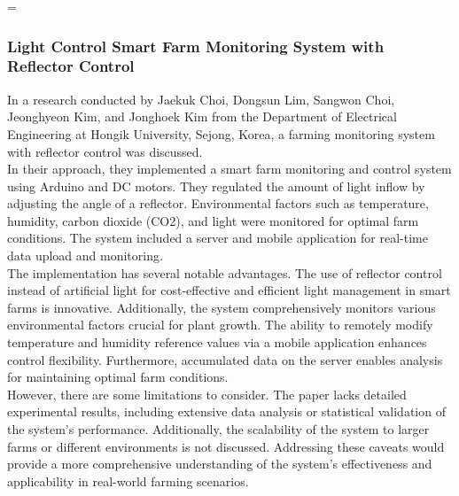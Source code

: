=\documentclass[12pt, a4paper]{article}
\begin{document}
\subsubsection{Light Control Smart Farm Monitoring System with Reflector Control}
In a research conducted by Jaekuk Choi, Dongsun Lim, Sangwon Choi, Jeonghyeon Kim, and Jonghoek Kim \cite{choi2020light} from the Department of Electrical Engineering at Hongik University, Sejong, Korea, a farming monitoring system with reflector control was discussed.\\
In their approach, they implemented a smart farm monitoring and control system using Arduino and DC motors. They regulated the amount of light inflow by adjusting the angle of a reflector. Environmental factors such as temperature, humidity, carbon dioxide (CO2), and light were monitored for optimal farm conditions. The system included a server and mobile application for real-time data upload and monitoring.\\
The implementation has several notable advantages. The use of reflector control instead of artificial light for cost-effective and efficient light management in smart farms is innovative. Additionally, the system comprehensively monitors various environmental factors crucial for plant growth. The ability to remotely modify temperature and humidity reference values via a mobile application enhances control flexibility. Furthermore, accumulated data on the server enables analysis for maintaining optimal farm conditions.\\
However, there are some limitations to consider. The paper lacks detailed experimental results, including extensive data analysis or statistical validation of the system's performance. Additionally, the scalability of the system to larger farms or different environments is not discussed. Addressing these caveats would provide a more comprehensive understanding of the system's effectiveness and applicability in real-world farming scenarios.
\end{document}
